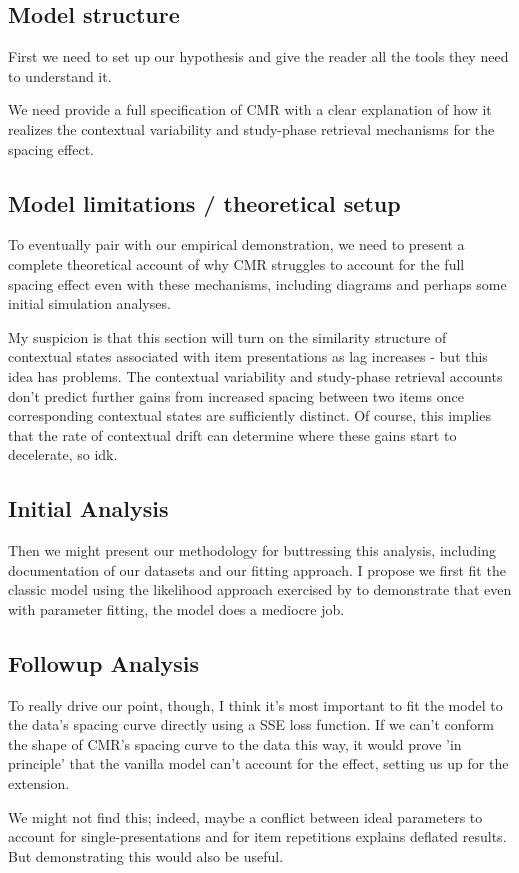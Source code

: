 \subsection{Model structure}
First we need to set up our hypothesis and give the reader all the tools they need to understand it. 

We need provide a full specification of CMR with a clear explanation of how it realizes the contextual variability and study-phase retrieval mechanisms for the spacing effect. 

\subsection{Model limitations / theoretical setup}
To eventually pair with our empirical demonstration, we need to present a complete theoretical account of why CMR struggles to account for the full spacing effect even with these mechanisms, including diagrams and perhaps some initial simulation analyses.

My suspicion is that this section will turn on the similarity structure of contextual states associated with item presentations as lag increases - but this idea has problems. The contextual variability and study-phase retrieval accounts don't predict further gains from increased spacing between two items once corresponding contextual states are sufficiently distinct. Of course, this implies that the rate of contextual drift can determine where these gains start to decelerate, so idk.

\subsection{Initial Analysis}
Then we might present our methodology for buttressing this analysis, including documentation of our datasets and our fitting approach. I propose we first fit the classic model using the likelihood approach exercised by \cite{morton2016predictive} to demonstrate that even with parameter fitting, the model does a mediocre job.

\subsection{Followup Analysis}
To really drive our point, though, I think it's most important to fit the model to the data's spacing curve directly using a SSE loss function. If we can't conform the shape of CMR's spacing curve to the data this way, it would prove 'in principle' that the vanilla model can't account for the effect, setting us up for the extension.

We might not find this; indeed, maybe a conflict between ideal parameters to account for single-presentations and for item repetitions explains deflated results. But demonstrating this would also be useful.

